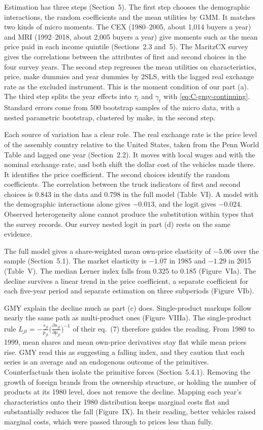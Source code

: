 Estimation has three steps (Section~5). The first step chooses the demographic interactions, the random coefficients
and the mean utilities by GMM. It matches two kinds of micro moments. The CEX (1980--2005, about 1,014 buyers a year)
and MRI (1992--2018, about 2,005 buyers a year) give moments such as the mean price paid in each income quintile
(Sections~2.3 and~5). The MaritzCX survey gives the correlations between the attributes of first and second choices in the
four survey years. The second step regresses the mean utilities on characteristics, price, make dummies and year
dummies by 2SLS, with the lagged real exchange rate as the excluded instrument. This is the moment condition of our part
(a). The third step splits the year effects into $\tau_t$ and $\gamma_t$ with \eqref{eq:C-gmy-continuing}. Standard
errors come from 500 bootstrap samples of the micro data, with a nested parametric bootstrap, clustered by make, in the
second step.

Each source of variation has a clear role. The real exchange rate is the price level of the assembly country relative
to the United States, taken from the Penn World Table and lagged one year (Section~2.2). It moves with local wages and
with the nominal exchange rate, and both shift the dollar cost of the vehicles made there. It identifies the price
coefficient. The second choices identify the random coefficients. The correlation between the truck indicators of first
and second choices is 0.843 in the data and 0.798 in the full model (Table~VI). A model with the demographic
interactions alone gives $-0.013$, and the logit gives $-0.024$. Observed heterogeneity alone cannot produce the
substitution within types that the survey records. Our survey nested logit in part (d) rests on the same evidence.

The full model gives a share-weighted mean own-price elasticity of $-5.06$ over the sample (Section~5.1). The market
elasticity is $-1.07$ in 1985 and $-1.29$ in 2015 (Table~V). The median Lerner index falls from 0.325 to 0.185
(Figure~VIa). The decline survives a linear trend in the price coefficient, a separate coefficient for each five-year
period and separate estimation on three subperiods (Figure~VIb).

GMY explain the decline much as part (c) does. Single-product markups follow nearly the same path as multi-product ones
(Figure~VIIIa). The single-product rule $L_{jt} = -\frac{s_{jt}}{p_{jt}}\big(\frac{\partial s_{jt}}{\partial
p_{jt}}\big)^{-1}$ of their eq.~(7) therefore guides the reading. From 1980 to 1999, mean shares and mean own-price
derivatives stay flat while mean prices rise. GMY read this as suggesting a falling index, and they caution that each
series is an average and an endogenous outcome of the primitives. Counterfactuals then isolate the primitive forces
(Section~5.4.1). Removing the growth of foreign brands from the ownership structure, or holding the number of products
at its 1980 level, does not remove the decline. Mapping each year's characteristics onto their 1980 distribution keeps
marginal costs flat and substantially reduces the fall (Figure~IX). In their reading, better vehicles raised marginal
costs, which were passed through to prices less than fully.

